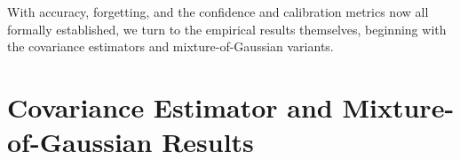 \begin{table}[htb]
	\centering
	\caption{Summary of the probabilistic calibration and uncertainty metrics used in this work. ``Better'' indicates the direction of the preferred value; ``context'' means both high and low values are informative depending on whether predictions are correct.}
	\label{tab:metrics_summary}
\end{table}

With accuracy, forgetting, and the confidence and calibration metrics now all formally established, we turn to the empirical results themselves, beginning with the covariance estimators and mixture-of-Gaussian variants.

\section{Covariance Estimator and Mixture-of-Gaussian Results}

